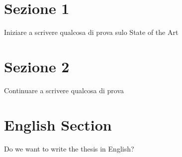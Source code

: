 
\section {Sezione 1}


Iniziare a scrivere qualcosa di prova sulo State of the Art


\section {Sezione 2}


Continuare a scrivere qualcosa di prova


\section{English Section}

Do we want to write the thesis in English?